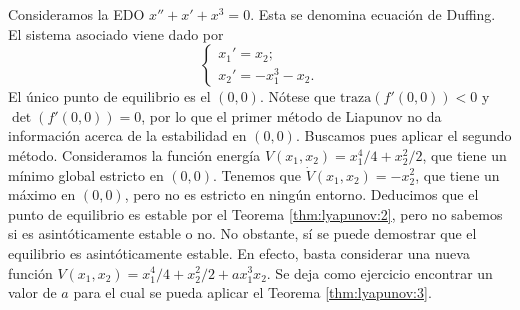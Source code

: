 \begin{ex}
  Consideramos la EDO $x'' + x' + x^3 = 0$. Esta se denomina ecuación de Duffing. El sistema
  asociado viene dado por
  \[
    \begin{cases}
      x_1' = x_2;\\
      x_2' = - x_1^3 - x_2.
    \end{cases}
  \]
  El único punto de equilibrio es el $(0,0)$. Nótese que $\mathrm{traza}(f'(0,0)) < 0$ y
  $\det(f'(0,0)) = 0$, por lo que el primer método de Liapunov no da información acerca de la
  estabilidad en $(0,0)$. Buscamos pues aplicar el segundo método. Consideramos la función energía
  $V(x_1, x_2) = x_1^4 / 4 + x_2^2 / 2$, que tiene un mínimo global estricto en $(0,0)$. Tenemos que
  $\dot{V}(x_1, x_2) = -x_2^2$, que tiene un máximo en $(0,0)$, pero no es estricto en ningún
  entorno. Deducimos que el punto de equilibrio es estable por el Teorema \ref{thm:lyapunov:2}, pero
  no sabemos si es asintóticamente estable o no. No obstante, sí se puede demostrar que el
  equilibrio es asintóticamente estable. En efecto, basta considerar una nueva función
  $V(x_1, x_2) = x_1^4 / 4 + x_2^2 / 2 + ax_1^3 x_2$. Se deja como ejercicio encontrar un valor de
  $a$ para el cual se pueda aplicar el Teorema \ref{thm:lyapunov:3}.
\end{ex}

